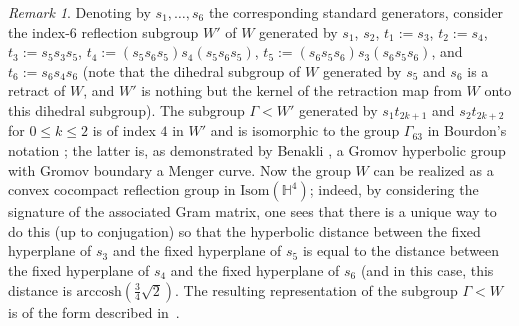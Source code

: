 \documentclass{amsart}
\theoremstyle{plain}
\theoremstyle{definition}
\theoremstyle{remark}
\newtheorem{remark}[theorem]{Remark}
\numberwithin{equation}{section}
\newcommand{\hh}{\mathbb H}
\renewcommand{\leq}{\leqslant}
\begin{document}
\begin{remark}
Denoting by $s_1, \ldots, s_6$ the corresponding standard generators, consider the index-$6$ reflection subgroup $W'$ of $W$ generated by $s_1$, $s_2$, $t_1 := s_3$, $t_2:= s_4$, $t_3:= s_5s_3s_5$, $t_4:= (s_5s_6s_5)s_4(s_5s_6s_5)$, $t_5:= (s_6s_5s_6)s_3(s_6s_5s_6)$, and $t_6:= s_6s_4s_6$ (note that the dihedral subgroup of $W$ generated by $s_5$ and $s_6$ is a retract of $W$, and $W'$ is nothing but the kernel of the retraction map from $W$ onto this dihedral subgroup). The subgroup $\Gamma < W'$ generated by $s_1t_{2k+1}$ and $s_2t_{2k+2}$ for $0 \leq k \leq 2$ is of index $4$ in $W'$ and is isomorphic to the group $\Gamma_{63}$ in Bourdon's notation \cite{BO97}; the latter is, as demonstrated by Benakli \cite{BE92}, a Gromov hyperbolic group with Gromov boundary a Menger curve. Now the group $W$ can be realized as a convex cocompact reflection group in $\mathrm{Isom} (\hh^4)$; indeed, by considering the signature of the associated Gram matrix, one sees that there is a unique way to do this (up to conjugation) so that the hyperbolic distance between the fixed hyperplane of $s_3$ and the fixed hyperplane of $s_5$ is equal to the distance between the fixed hyperplane of $s_4$ and the fixed hyperplane of $s_6$ (and in this case, this distance is $\mathrm{arccosh}\left(\tfrac{3}{4}\sqrt{2}\right)$. The resulting representation of the subgroup $\Gamma < W$ is of the form described in~\cite{BO97}. 

\end{remark}

 
\printbibliography
% 
% 
\end{document}
